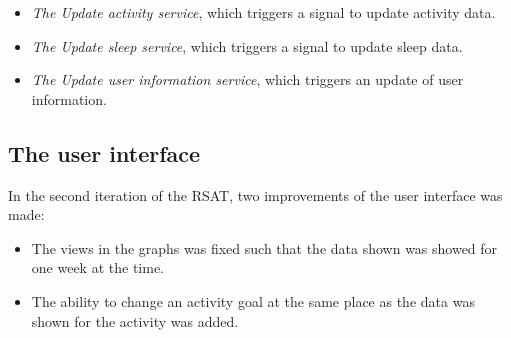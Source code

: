 \documentclass{cslthse-msc}
\begin{document}
\begin{itemize}
\item \emph{The Update activity service}, which triggers a signal to update activity data.
\item \emph{The Update sleep service}, which triggers a signal to update sleep data.
\item \emph{The Update user information service}, which triggers an update of user information.
\end{itemize}





\subsection{The user interface}

In the second iteration of the RSAT, two improvements of the user interface was made:

\begin{itemize}
\item The views in the graphs was fixed such that the data shown was showed for one week at the time. 
\item The ability to change an activity goal at the same place as the data was shown for the activity was added.
\end{itemize}
\end{document}
